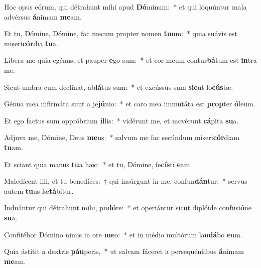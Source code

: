 \item Hoc opus eórum, qui détrahunt mihi apud \textbf{Dó}minum:~* et qui loquúntur mala advérsus \textbf{á}nimam \textbf{me}am.
\item Et tu, Dómine, Dómine, fac mecum propter nomen \textbf{tu}um:~* quia suávis est miseri\textbf{cór}dia \textbf{tu}a.
\item Líbera me quia egénus, et pauper \textbf{e}go sum:~* et cor meum contur\textbf{bá}tum est \textbf{in}tra me.
\item Sicut umbra cum declínat, ab\textbf{lá}tus sum:~* et excússus sum \textbf{sic}ut lo\textbf{cús}tæ.
\item Génua mea infirmáta sunt a je\textbf{jú}nio:~* et caro mea immutáta est \textbf{prop}ter \textbf{ó}leum.
\item Et ego factus sum oppróbrium \textbf{il}lis:~* vidérunt me, et movérunt \textbf{cá}pita \textbf{su}a.
\item Adjuva me, Dómine, Deus \textbf{me}us:~* salvum me fac secúndum miseri\textbf{cór}diam \textbf{tu}am.
\item Et sciant quia manus \textbf{tu}a hæc:~* et tu, Dómine, fe\textbf{cís}ti \textbf{e}am.
\item Maledícent illi, et tu benedíces:~† qui insúrgunt in me, confun\textbf{dán}tur:~* servus autem \textbf{tu}us læ\textbf{tá}bitur.
\item Induántur qui détrahunt mihi, pu\textbf{dó}re:~* et operiántur sicut diplóide confusi\textbf{ó}ne \textbf{su}a.
\item Confitébor Dómino nimis in ore \textbf{me}o:~* et in médio multórum lau\textbf{dá}bo \textbf{e}um.
\item Quia ástitit a dextris \textbf{páu}peris,~* ut salvam fáceret a persequéntibus \textbf{á}nimam \textbf{me}am.
